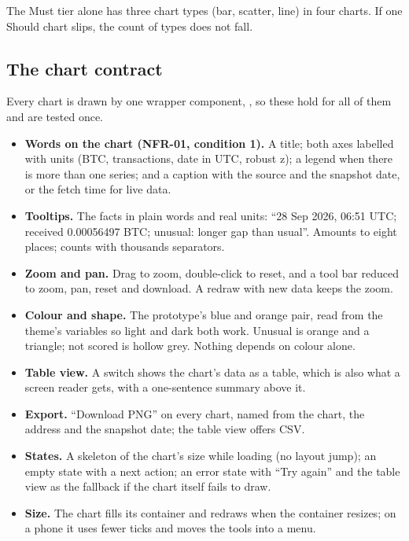 The Must tier alone has three chart types (bar, scatter, line) in four charts. If one Should chart
slips, the count of types does not fall.

\subsection{The chart contract}
\label{sec:chartcontract}

Every chart is drawn by one wrapper component, , so these hold for
all of them and are tested once.

\begin{itemize}
  \item \textbf{Words on the chart (NFR-01, condition 1).} A title; both axes labelled with units
    (BTC, transactions, date in UTC, robust z); a legend when there is more than one series; and a
    caption with the source and the snapshot date, or the fetch time for live data.
  \item \textbf{Tooltips.} The facts in plain words and real units: ``28 Sep 2026, 06:51 UTC;
    received 0.00056497 BTC; unusual: longer gap than usual''. Amounts to eight places; counts with
    thousands separators.
  \item \textbf{Zoom and pan.} Drag to zoom, double-click to reset, and a tool bar reduced to
    zoom, pan, reset and download. A redraw with new data keeps the zoom.
  \item \textbf{Colour and shape.} The prototype's blue and orange pair, read from the theme's
    variables so light and dark both work. Unusual is orange and a triangle; not scored is hollow
    grey. Nothing depends on colour alone.
  \item \textbf{Table view.} A switch shows the chart's data as a table, which is also what a
    screen reader gets, with a one-sentence summary above it.
  \item \textbf{Export.} ``Download PNG'' on every chart, named from the chart, the address and the
    snapshot date; the table view offers CSV.
  \item \textbf{States.} A skeleton of the chart's size while loading (no layout jump); an empty
    state with a next action; an error state with ``Try again'' and the table view as the fallback
    if the chart itself fails to draw.
  \item \textbf{Size.} The chart fills its container and redraws when the container resizes; on a
    phone it uses fewer ticks and moves the tools into a menu.
\end{itemize}

